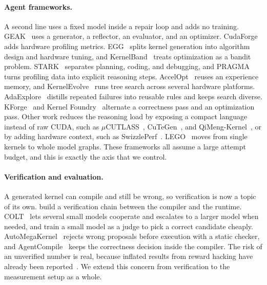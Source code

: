 \documentclass[11pt]{article}
\begin{document}
\paragraph{Agent frameworks.}
A second line uses a fixed model inside a repair loop and adds no training.
GEAK~\citep{wang2025geak} uses a generator, a reflector, an evaluator, and an optimizer.
CudaForge~\citep{cudaforge2025} adds hardware profiling metrics. EGG~\citep{egg2026} splits kernel
generation into algorithm design and hardware tuning, and KernelBand~\citep{kernelband2026} treats
optimization as a bandit problem. STARK~\citep{stark2026} separates planning, coding, and
debugging, and PRAGMA~\citep{lei2025pragma} turns profiling data into explicit reasoning steps.
AccelOpt~\citep{accelopt2025} reuses an experience memory, and
KernelEvolve~\citep{liao2026kernelevolve} runs tree search across several hardware platforms.
AdaExplore~\citep{du2026adaexplore} distills repeated failures into reusable rules and keeps search
diverse. KForge~\citep{sereda2026kforge} and Kernel Foundry~\citep{huang2026kernelfoundry} alternate
a correctness pass and an optimization pass. Other work reduces the reasoning load by exposing a
compact language instead of raw CUDA, such as $\mu$CUTLASS~\citep{hari2026ucutlass},
CuTeGen~\citep{saba2026cutegen}, and QiMeng-Kernel~\citep{qimengkernel2026}, or by adding hardware
context, such as SwizzlePerf~\citep{swizzleperf2025}. LEGO~\citep{lego2026} moves from single kernels
to whole model graphs. These frameworks all assume a large attempt budget, and this is exactly
the axis that we control.

\paragraph{Verification and evaluation.}
A generated kernel can compile and still be wrong, so verification is now a topic of its own.
\citet{kwon2026cove} build a verification chain between the compiler and the runtime.
COLT~\citep{tang2026colt} lets several small models cooperate and escalates to a larger model when
needed, and \citet{crupi2026slmjudge} train a small model as a judge to pick a correct
candidate cheaply. AutoMegaKernel~\citep{jaber2026automegakernel} rejects wrong proposals before
execution with a static checker, and AgentCompile~\citep{li2026agentcompile} keeps the correctness
decision inside the compiler. The risk of an unverified number is real, because inflated results
from reward hacking have already been reported~\citep{lange2025aicudaengineer}. We extend this
concern from verification to the measurement setup as a whole.
\end{document}
